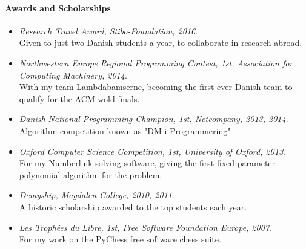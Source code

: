 \documentclass[11pt]{article}
\begin{document}
\paragraph{Awards and Scholarships}
\begin{itemize}
   \item[]
   \emph{Research Travel Award,
            Stibo-Foundation,
      2016}.
   \\
   Given to just two Danish students a year, to collaborate in research abroad.
   \item[]
   \emph{Northwestern Europe Regional Programming Contest,
               1st,
            Association for Computing Machinery,
      2014}.
   \\
   With my team Lambdabamserne, becoming the first ever Danish team to qualify for the ACM wold finals.
   \item[]
   \emph{Danish National Programming Champion,
               1st,
            Netcompany,
      2013, 2014}.
   \\
   Algorithm competition known as "DM i Programmering" 
   \item[]
   \emph{Oxford Computer Science Competition,
               1st,
            University of Oxford,
      2013}.
   \\
   For my Numberlink solving software, giving the first fixed parameter polynomial algorithm for the problem.
   \item[]
   \emph{Demyship,
            Magdalen College,
      2010, 2011}.
   \\
   A historic scholarship awarded to the top students each year.
   \item[]
   \emph{Les Trophées du Libre,
               1st,
            Free Software Foundation Europe,
      2007}.
   \\
   For my work on the PyChess free software chess suite.
\end{itemize}
\end{document}

